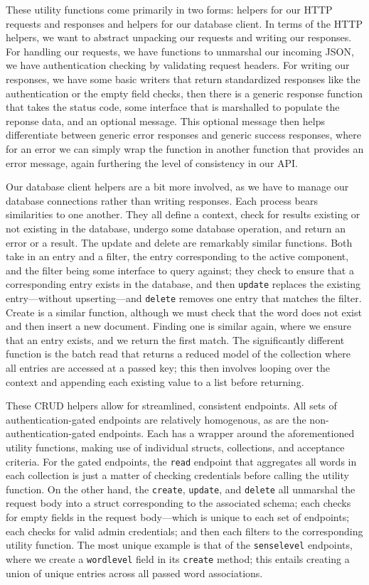 \documentclass[11pt, twoside, reqno]{book}
\begin{document}
These utility functions come primarily in two forms: helpers for our HTTP requests and responses and helpers for our database client. In terms of the HTTP helpers, we want to abstract unpacking our requests and writing our responses. For handling our requests, we have functions to unmarshal our incoming JSON, we have authentication checking by validating request headers. For writing our responses, we have some basic writers that return standardized responses like the authentication or the empty field checks, then there is a generic response function that takes the status code, some interface that is marshalled to populate the reponse data, and an optional message. This optional message then helps differentiate between generic error responses and generic success responses, where for an error we can simply wrap the function in another function that provides an error message, again furthering the level of consistency in our API.

Our database client helpers are a bit more involved, as we have to manage our database connections rather than writing responses. Each process bears similarities to one another. They all define a context, check for results existing or not existing in the database, undergo some database operation, and return an error or a result. The update and delete are remarkably similar functions. Both take in an entry and a filter, the entry corresponding to the active component, and the filter being some interface to query against; they check to ensure that a corresponding entry exists in the database, and then \texttt{update} replaces the existing entry—without upserting—and \texttt{delete} removes one entry that matches the filter. Create is a similar function, although we must check that the word does \textit{}not\textit{} exist and then insert a new document. Finding one is similar again, where we ensure that an entry exists, and we return the first match. The significantly different function is the batch read that returns a reduced model of the collection where all entries are accessed at a passed key; this then involves looping over the context and appending each existing value to a list before returning.

These CRUD helpers allow for streamlined, consistent endpoints. All sets of authentication-gated endpoints are relatively homogenous, as are the non-authentication-gated endpoints. Each has a wrapper around the aforementioned utility functions, making use of individual structs, collections, and acceptance criteria. For the gated endpoints, the \texttt{read} endpoint that aggregates all words in each collection is just a matter of checking credentials before calling the utility function. On the other hand, the \texttt{create}, \texttt{update}, and \texttt{delete} all unmarshal the request body into a struct corresponding to the associated schema; each checks for empty fields in the request body—which is unique to each set of endpoints; each checks for valid admin credentials; and then each filters to the corresponding utility function. The most unique example is that of the \texttt{senselevel} endpoints, where we create a \texttt{wordlevel} field in its \texttt{create} method; this entails creating a union of unique entries across all passed word associations.
\end{document}
